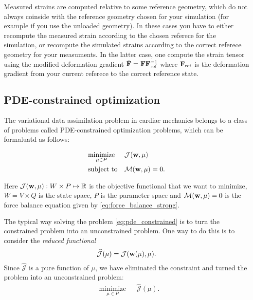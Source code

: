 \begin{remark}
  Measured strains are computed relative to some reference
  geometry, which do not always coinside with the reference geometry
  chosen for your simulation (for example if you use the unloaded geometry). In
  these cases you have to either recompute the measured strain
  according to the chosen referece for the simulation, or recompute
  the simulated strains according to the correct referece geometry for
  your measuments. In the latter case, one compute the strain tensor
  using the modified deformation gradient $\tilde{\mathbf{F}} = \mathbf{F}
  \mathbf{F}_{\mathrm{ref}}^{-1}$ where $\mathbf{F}_{\mathrm{ref}}$ is the deformation
  gradient from your current referece to the correct reference state. 
\end{remark}


\subsection{PDE-constrained optimization}


The variational data assimilation problem in cardiac mechanics belongs
to a class of problems called PDE-constrained optimization problems,
which can be formaluatd as follows:

\begin{equation}
  \begin{aligned}
    \label{eq:pde_constrained}
    & \underset{\mu \in P}{\text{minimize}}
    & &  \mathcal{J}(\mathbf{w}, \mu) \\
    & \text{subject to}
    & & \mathcal{M}(\mathbf{w}, \mu) = 0.
  \end{aligned}
\end{equation}

Here $\mathcal{J}(\mathbf{w}, \mu): W \times P \mapsto
\mathbb{R}$ is the objective functional that we want to minimize,
$W = V \times Q$ is the state space, $P$ is the parameter space
and $ \mathcal{M}(\mathbf{w}, \mu) = 0$ is the force balance
equation given by \eqref{eq:force_balance_strong}.



The typical way solving the problem \eqref{eq:pde_constrained} is to
turn the constrained problem into an unconstrained problem. One way
to do this is to consider the \emph{reduced functional}
\begin{align}
  \widehat{\mathcal{J}}(\mu) = \mathcal{J}(\mathbf{w}(\mu), \mu).
\end{align}
Since $\widehat{\mathcal{J}}$ is a pure function of $\mu$, we have
eliminated the constraint and turned the problem into an unconstrained
problem:
\begin{equation}
  \begin{aligned}
    \label{eq:pde_unconstrained}
    & \underset{\mu \in P}{\text{minimize}}
    & &  \widehat{\mathcal{J}}(\mu).
  \end{aligned}
\end{equation}

